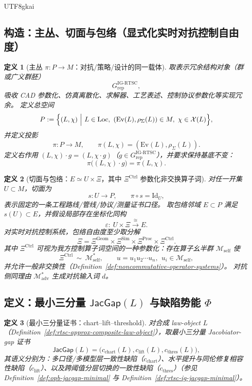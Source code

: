 \documentclass[12pt]{article}
\newtheorem{definition}{定义}[section]
\newcommand{\JacGap}{\ensuremath{\mathsf{JacGap}}}
\begin{document}
\begin{CJK*}{UTF8}{gkai}
\subsection{构造：主丛、切面与包络（显式化实时对抗控制自由度）}

\begin{definition}[主丛 $\pi:P\to M$：对抗/策略/设计的同一载体]
\label{def:rtsc-approx-principal-bundle}
取表示冗余结构对象（群或广义群胚）
\[
G_{\mathrm{rep}}^{\mathrm{IG\text{-}RTSC}},
\]
吸收 CAD 参数化、仿真离散化、求解器、工艺表述、控制协议参数化等实现冗余。
定义总空间
\[
P
:=
\Bigl\{
(L,\chi)\ \Big|\
L\in\mathrm{Loc},\ (\mathrm{Ev}(L),\rho_{\Sigma}(L))\in M,\ \chi\in\mathcal{X}(L)
\Bigr\},
\]
并定义投影
\[
\pi:P\to M,\qquad \pi(L,\chi)=(\mathrm{Ev}(L),\rho_{\Sigma}(L)).
\]
定义右作用 $(L,\chi)\cdot g=(L,\chi\cdot g)$（$g\in G_{\mathrm{rep}}^{\mathrm{IG\text{-}RTSC}}$），并要求保持基底不变：
\[
\pi\bigl((L,\chi)\cdot g\bigr)=\pi(L,\chi).
\]
\end{definition}

\begin{definition}[切面与包络：$E\simeq U\times\Xi$，其中 $\Xi^{\mathrm{Ctrl}}$ 参数化非交换算子词]
\label{def:rtsc-approx-envelope}
对任一开集 $U\subset M$，切面为
\[
s:U\to P,\qquad \pi\circ s=\mathrm{Id}_U,
\]
表示固定的一条工程路线/管线/协议/测量证书口径。
取包络邻域 $E\subset P$ 满足 $s(U)\subset E$，并假设局部存在坐标化同构
\[
\varepsilon:\ U\times\Xi \xrightarrow{\ \cong\ } E.
\]
对实时对抗控制系统，包络自由度至少取分解
\[
\Xi
=
\Xi^{\mathrm{Geom}}
\times
\Xi^{\mathrm{Sim}}
\times
\Xi^{\mathrm{Proc}}
\times
\Xi^{\mathrm{Ctrl}}.
\]
其中 $\Xi^{\mathrm{Ctrl}}$ 可视为我方控制算子词空间的一种参数化：存在算子幺半群 $\mathcal{M}_{\mathrm{self}}$ 使
\[
\Xi^{\mathrm{Ctrl}}\ \sim\ \mathcal{M}_{\mathrm{self}}^\ast,
\qquad
u=u_1u_2\cdots u_n,\ \ u_i\in\mathcal{M}_{\mathrm{self}},
\]
并允许一般非交换性（Definition~\ref{def:noncommutative-operator-systems}）。
对抗侧同理由 $\mathcal{M}_{\mathrm{adv}}^\ast$ 生成对抗输入词 $d$。
\end{definition}

\subsection{定义：最小三分量 $\JacGap(L)$ 与缺陷势能 $\Phi$}

\begin{definition}[最小三分量证书：chart--lift--threshold]
\label{def:rtsc-approx-jacgap}
对合成 law-object $L$（Definition~\ref{def:rtsc-approx-composite-law-object}），取最小三分量 Jacobiator-gap 证书
\[
\JacGap(L)=\bigl(c_{\mathrm{chart}}(L),c_{\mathrm{lift}}(L),c_{\mathrm{thres}}(L)\bigr),
\]
其语义分别为：多口径/多模型层一致性缺陷（$c_{\mathrm{chart}}$）、水平提升与同伦修复相容性缺陷（$c_{\mathrm{lift}}$）、以及跨阈值分层切换的一致性缺陷（$c_{\mathrm{thres}}$）（参见
  Definition~\ref{def:opb-jacgap-minimal} 与 Definition~\ref{def:rtsc-ig-jacgap-minimal}）。
\end{definition}


\end{CJK*}
\end{document}
